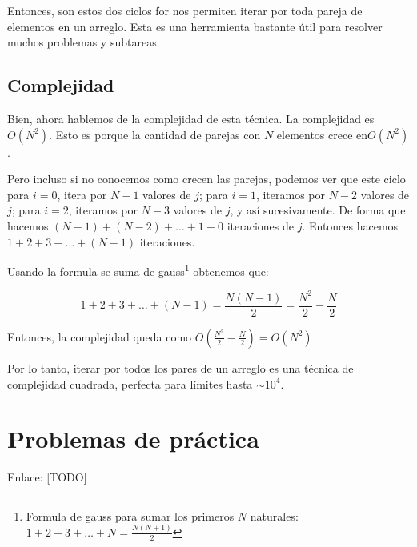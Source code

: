 Entonces, son estos dos ciclos for nos permiten iterar por toda pareja de elementos en un arreglo. Esta es una herramienta bastante útil para resolver muchos problemas y subtareas.

\subsection {Complejidad}
Bien, ahora hablemos de la complejidad de esta técnica. La complejidad es \(O(N^2)\). Esto es porque la cantidad de parejas con \(N\) elementos crece en\(O(N^2)\).

Pero incluso si no conocemos como crecen las parejas, podemos ver que este ciclo para \(i = 0\), itera por \(N-1\) valores de \(j\); para \(i=1\), iteramos por \(N-2\) valores de \(j\); para \(i=2\), iteramos por \(N-3\) valores de \(j\), y así sucesivamente. De forma que hacemos \((N-1)+(N-2)+\ldots+1+0\) iteraciones de \(j\). Entonces hacemos \(1+2+3+\ldots+(N-1)\) iteraciones.

Usando la formula se suma de gauss\footnote{Formula de gauss para sumar los primeros \(N\) naturales: \(1+2+3+\ldots+N=\frac{N(N+1)}{2}\)} obtenemos que:

\[1+2+3+\ldots+(N-1)=\frac{N(N-1)}{2}=\frac{N^2}{2}-\frac{N}{2}\]

Entonces, la complejidad queda como \(O(\frac{N^2}{2}-\frac{N}{2})=O(N^2)\)

Por lo tanto, iterar por todos los pares de un arreglo es una técnica de complejidad cuadrada, perfecta para límites hasta \(\sim{10^4}\).


\section*{Problemas de práctica}

\begin{exercise}
\end{exercise}


\begin{exercise}
\end{exercise}

\begin{exercise}
\end{exercise}

\begin{exercise}
\end{exercise}
 
 
\begin{exercise}
\end{exercise}
Enlace: [TODO]